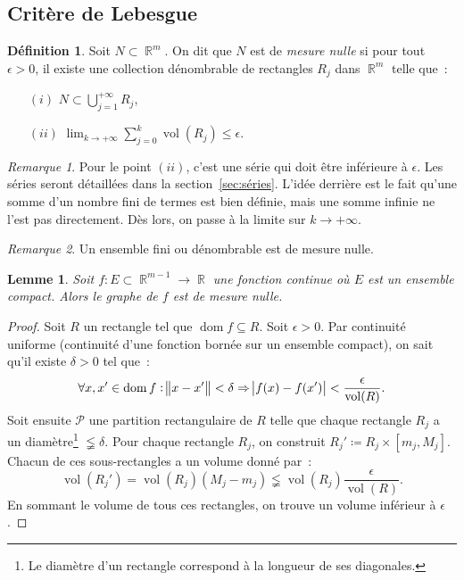\documentclass{article}
\DeclareMathOperator{\dom}{dom}
\DeclareMathOperator{\R}{\mathbb R}
\DeclareMathOperator{\vol}{vol}
\newtheorem{lem}[thm]{Lemme}
\theoremstyle{definition}
\newtheorem{déf}[thm]{Définition}
\theoremstyle{remark}
\newtheorem*{rmq}{Remarque}
\begin{document}
	\subsection{Critère de Lebesgue}
		\begin{déf} Soit $N \subset \R^m$. On dit que $N$ est de \emph{mesure nulle} si pour tout $\epsilon > 0$, il existe une collection dénombrable de
		rectangles $R_j$ dans $\R^m$ telle que~:
		\begin{itemize}
			\item[$(i)$]  $\displaystyle N \subset \bigcup_{j=1}^{+\infty}R_j$,
			\item[$(ii)$] $\displaystyle \lim_{k \to +\infty}\sum_{j=0}^k\vol(R_j) \leq \epsilon$.
		\end{itemize}
		\end{déf}

		\begin{rmq} Pour le point $(ii)$, c'est une série qui doit être inférieure à $\epsilon$.  Les séries seront détaillées dans la section~\ref{sec:séries}.
		L'idée derrière est le fait qu'une somme d'un nombre fini de termes est bien définie, mais une somme infinie ne l'est pas directement. Dès lors, on
		passe à la limite sur $k \to +\infty$.
		\end{rmq}

		\begin{rmq} Un ensemble fini ou dénombrable est de mesure nulle. \end{rmq}

		\begin{lem} Soit $f : E \subset \R^{m-1} \to \R$ une fonction continue où $E$ est un ensemble compact. Alors le graphe de $f$ est de mesure nulle.
		\end{lem}

		\begin{proof} Soit $R$ un rectangle tel que $\dom f \subseteq R$. Soit $\epsilon > 0$. Par continuité uniforme (continuité d'une fonction bornée sur un
		ensemble compact), on sait qu'il existe $\delta > 0$ tel que~:
		\[\forall x, x' \in \dom f : \norm{x-x'} < \delta \Rightarrow \abs{f(x)-f(x')} < \frac \epsilon{\vol(R)}.\]
		Soit ensuite $\mathcal P$ une partition rectangulaire de $R$ telle que chaque rectangle $R_j$ a un diamètre\footnote{Le diamètre d'un rectangle
		correspond à la longueur de ses diagonales.} $\lneqq \delta$. Pour chaque rectangle $R_j$, on construit $R_j' \coloneqq R_j \times [m_j, M_j]$.
		Chacun de ces sous-rectangles a un volume donné par~:
		\[\vol(R_j') = \vol(R_j)(M_j-m_j) \lneqq \vol(R_j)\frac \epsilon{\vol(R)}.\]
		En sommant le volume de tous ces rectangles, on trouve un volume inférieur à $\epsilon$.
		\end{proof}
\end{document}
